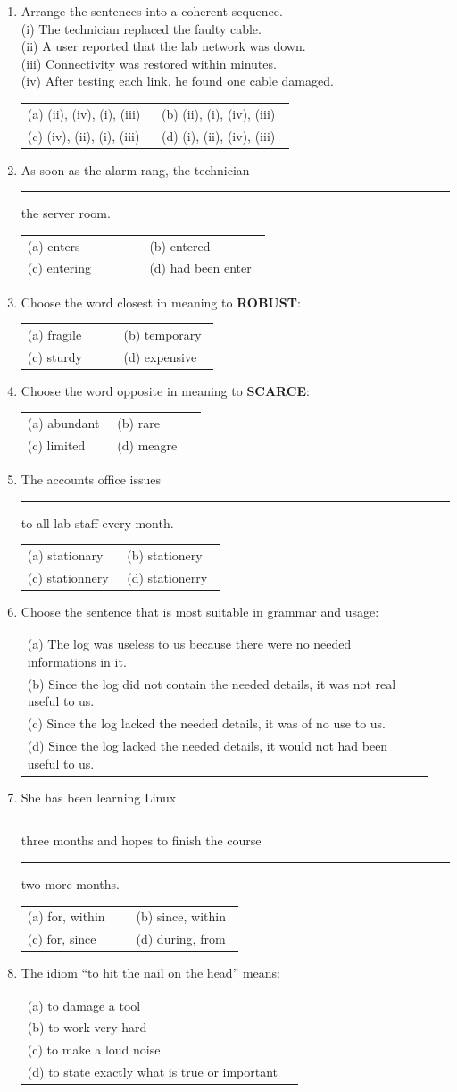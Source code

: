 \documentclass[11pt,a4paper]{article}
\makeatletter
\newcommand{\opts}[4]{\par\nopagebreak\vspace{2pt}%
\begin{tabular}{@{}p{0.47\linewidth}p{0.47\linewidth}@{}}
(a) #1 & (b) #2\\ (c) #3 & (d) #4\end{tabular}}
\newcommand{\optl}[4]{\par\nopagebreak\vspace{2pt}%
\begin{tabular}{@{}p{0.95\linewidth}@{}}
(a) #1\\ (b) #2\\ (c) #3\\ (d) #4\end{tabular}}
\makeatother
\begin{document}
\begin{enumerate}
\item Arrange the sentences into a coherent sequence.\\ (i) The technician replaced the faulty cable.\\ (ii) A user reported that the lab network was down.\\ (iii) Connectivity was restored within minutes.\\ (iv) After testing each link, he found one cable damaged.
\opts{(ii), (iv), (i), (iii)}{(ii), (i), (iv), (iii)}{(iv), (ii), (i), (iii)}{(i), (ii), (iv), (iii)}
\item As soon as the alarm rang, the technician \rule{1.2cm}{0.4pt} the server room.
\opts{enters}{entered}{entering}{had been enter}
\item Choose the word closest in meaning to \textbf{ROBUST}:
\opts{fragile}{temporary}{sturdy}{expensive}
\item Choose the word opposite in meaning to \textbf{SCARCE}:
\opts{abundant}{rare}{limited}{meagre}
\item The accounts office issues \rule{1.2cm}{0.4pt} to all lab staff every month.
\opts{stationary}{stationery}{stationnery}{stationerry}
\item Choose the sentence that is most suitable in grammar and usage:
\optl{The log was useless to us because there were no needed informations in it.}{Since the log did not contain the needed details, it was not real useful to us.}{Since the log lacked the needed details, it was of no use to us.}{Since the log lacked the needed details, it would not had been useful to us.}
\item She has been learning Linux \rule{1.2cm}{0.4pt} three months and hopes to finish the course \rule{1.2cm}{0.4pt} two more months.
\opts{for, within}{since, within}{for, since}{during, from}
\item The idiom ``to hit the nail on the head'' means:
\optl{to damage a tool}{to work very hard}{to make a loud noise}{to state exactly what is true or important}
\end{enumerate}
\par\vspace{4pt}\par\vspace{2pt}
\end{document}
